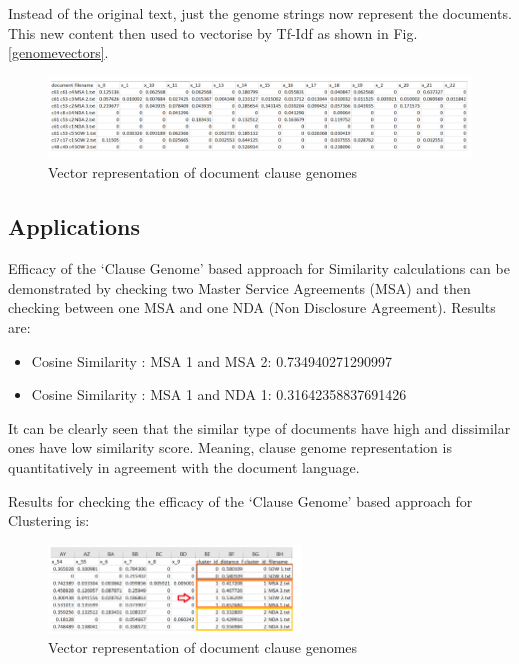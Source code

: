 \documentclass[9pt,academicons]{article}
\begin{document}
Instead of the original text, just the genome strings now represent the documents. This new content then used to vectorise by Tf-Idf as shown in Fig. \ref{genomevectors}.

 \begin{figure}[h!]
 \begin{center}
  \includegraphics[width=\textwidth]{img/genomevectors.png}
  \caption{Vector representation of document clause genomes}
  \label{fig:genomevectors}
 \end{center}
 \end{figure}


\subsection{Applications}
\label{subsec:application}

Efficacy of the `Clause Genome' based approach for Similarity calculations can be demonstrated by checking two Master Service Agreements (MSA) and then checking between one MSA and one NDA (Non Disclosure Agreement). Results are:

 \begin{itemize}
 \item Cosine Similarity : MSA 1 and MSA 2: 0.734940271290997 
\item Cosine Similarity : MSA 1 and NDA 1: 0.31642358837691426 
\end{itemize}

It can be clearly seen that the similar type of documents have high and dissimilar ones have low similarity score. Meaning, clause genome
representation is quantitatively in agreement with the document language.

Results for checking the efficacy of the `Clause Genome' based approach for Clustering is:

 \begin{figure}[h!]
 \begin{center}
  \includegraphics[width=0.6\textwidth]{img/genomeclustering.png}
  \caption{Vector representation of document clause genomes}
  \label{fig:genomeclustering}
 \end{center}
 \end{figure}
 
\end{document}
